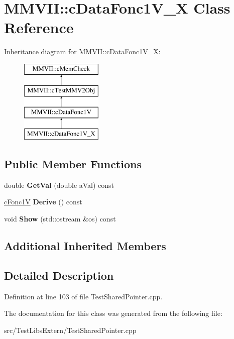 \hypertarget{classMMVII_1_1cDataFonc1V__X}{}\section{M\+M\+V\+II\+:\+:c\+Data\+Fonc1\+V\+\_\+X Class Reference}
\label{classMMVII_1_1cDataFonc1V__X}
Inheritance diagram for M\+M\+V\+II\+:\+:c\+Data\+Fonc1\+V\+\_\+X\+:\begin{figure}[H]
\begin{center}
\leavevmode
\includegraphics[height=4.000000cm]{classMMVII_1_1cDataFonc1V__X}
\end{center}
\end{figure}
\subsection*{Public Member Functions}
\begin{DoxyCompactItemize}
\item 
double {\bfseries Get\+Val} (double a\+Val) const \hypertarget{classMMVII_1_1cDataFonc1V__X_a65bf66171661f8bbd442614081433b1e}{}\label{classMMVII_1_1cDataFonc1V__X_a65bf66171661f8bbd442614081433b1e}

\item 
\hyperlink{classMMVII_1_1cFonc1V}{c\+Fonc1V} {\bfseries Derive} () const \hypertarget{classMMVII_1_1cDataFonc1V__X_ac49b5399d85ab1a5ed62c59742638e02}{}\label{classMMVII_1_1cDataFonc1V__X_ac49b5399d85ab1a5ed62c59742638e02}

\item 
void {\bfseries Show} (std\+::ostream \&os) const \hypertarget{classMMVII_1_1cDataFonc1V__X_a63d02b0831595ef64900ee4777b4c486}{}\label{classMMVII_1_1cDataFonc1V__X_a63d02b0831595ef64900ee4777b4c486}

\end{DoxyCompactItemize}
\subsection*{Additional Inherited Members}


\subsection{Detailed Description}


Definition at line 103 of file Test\+Shared\+Pointer.\+cpp.



The documentation for this class was generated from the following file\+:\begin{DoxyCompactItemize}
\item 
src/\+Test\+Libs\+Extern/Test\+Shared\+Pointer.\+cpp\end{DoxyCompactItemize}
